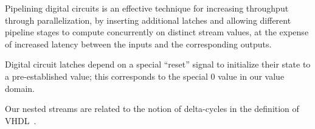 Pipelining digital circuits is an effective technique for increasing throughput
through parallelization, by inserting additional latches and allowing different
pipeline stages to compute concurrently on distinct stream values, at the expense 
of increased latency between the inputs and the corresponding outputs.

Digital circuit latches depend on a special ``reset'' signal to initialize their
state to a pre-established value; this corresponds to the special 0 value in our 
value domain. 

Our nested streams  
are related to the notion of delta-cycles in the definition of VHDL~\cite{baker-date96}.


